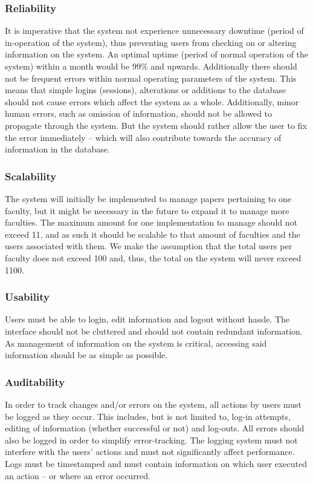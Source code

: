 \documentclass[a4paper,12pt]{article}
\begin{document}
\subsubsection{Reliability}
It is imperative that the system not experience unnecessary downtime (period of in-operation of the system), thus preventing users from checking on or altering information on the system. An optimal uptime (period of normal operation of the system) within a month would be 99\% and upwards. Additionally there should not be frequent errors within normal operating parameters of the system. This means that simple logins (sessions), alterations or additions to the database should not cause errors which affect the system as a whole. Additionally, minor human errors, such as omission of information, should not be allowed to propagate through the system. But the system should rather allow the user to fix the error immediately – which will also contribute towards the accuracy of information in the database.

\subsubsection{Scalability}
The system will initially be implemented to manage papers pertaining to one faculty, but it might be necessary in the future to expand it to manage more faculties. The maximum amount for one implementation to manage should not exceed 11, and as such it should be scalable to that amount of faculties and the users associated with them. We make the assumption that the total users per faculty does not exceed 100 and, thus, the total on the system will never exceed 1100.

\subsubsection{Usability} 
Users must be able to login, edit information and logout without hassle. The interface should not be cluttered and should not contain redundant information. As management of information on the system is critical, accessing said information should be as simple as possible.

\subsubsection{Auditability}
In order to track changes and/or errors on the system, all actions by users must be logged as they occur. This includes, but is not limited to, log-in attempts, editing of information (whether successful or not) and log-outs. All errors should also be logged in order to simplify error-tracking. The logging system must not interfere with the users' actions and must not significantly affect performance. Logs must be timestamped and must contain information on which user executed an action – or where an error occurred.
\end{document}
